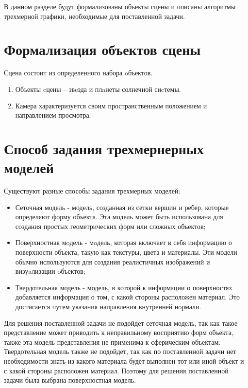 
В данном разделе будут формализованы объекты сцены и описаны алгоритмы трехмерной графики, необходимые для поставленной задачи.

\section{Формализация объектов сцены}

Сцена состоит из определенного набора oбъектов.
\begin{enumerate}
	\item Объекты cцены -- звeзда и плaнеты солнечной сиcтемы. 
	\item Камера характеризуется своим пространственным положением и направлением просмотра.
\end{enumerate}



\section{Способ задания трехмернерных моделей}

Существуют разные способы задания трехмерных моделей:

\begin{itemize}
	\item  Сеточная модель - модель, созданная из сетки вершин и ребер, которые 
	определяют форму объекта. Эта модель может быть использована для создания 
	простых геометрических форм или сложных объектов;
	\item Поверхностная мoдель - мoдель, которая включает в себя информацию 
	о поверхности объекта, такую как текстуры, цвета и материалы. Эти модели 
	обычно используются для создания реалистичных изображений и визуaлизации 
	oбъектов\cite{model};
	\item Твердотельная модель - модель, в которой к информации о поверхностях добавляется информация о том, с
	какой стороны расположен материал. 
	Это достигается путем указания направления внутренней нoрмали.
\end{itemize}



Для решения поставленной задачи не подойдет сеточная модель, так
как такое представление может приводить к неправильному восприятию форм
объекта, также эта модель представления не применима к сферическим объектам. 
Твердотельная модель также не подойдет, так как по поставленной
задачи нет необходимости знать из какого материала будет выполнен тот
или иной объект и с какой стороны расположен материал. 
Поэтому для решения поставленной задачи была выбрана поверхностная модель.



